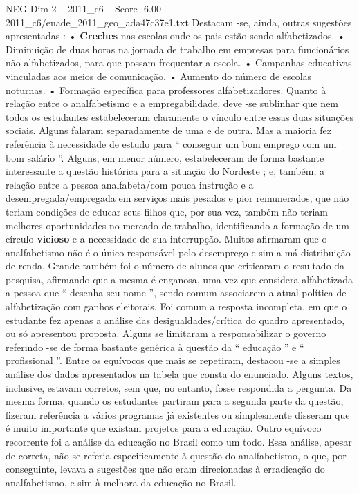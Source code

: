 \begin{textsample}{NEG Dim 2 – 2011\_c6 – Score -6.00 – 2011\_c6/enade\_2011\_geo\_ada47c37e1.txt}
Destacam -se, ainda, outras sugestões apresentadas : • \textbf{Creches} nas escolas onde os pais estão sendo alfabetizados. • Diminuição de duas horas na jornada de trabalho em empresas para funcionários não alfabetizados, para que possam frequentar a escola. • Campanhas educativas vinculadas aos meios de comunicação. • Aumento do número de escolas noturnas. • Formação específica para professores alfabetizadores.
Quanto à relação entre o analfabetismo e a empregabilidade, deve -se sublinhar que nem todos os estudantes estabeleceram claramente o vínculo entre essas duas situações sociais.
Alguns falaram separadamente de uma e de outra.
Mas a maioria fez referência à necessidade de estudo para “ conseguir um bom emprego com um bom salário ”.
Alguns, em menor número, estabeleceram de forma bastante interessante a questão histórica para a situação do Nordeste ; e, também, a relação entre a pessoa analfabeta/com pouca instrução e a desempregada/empregada em serviços mais pesados e pior remunerados, que não teriam condições de educar seus filhos que, por sua vez, também não teriam melhores oportunidades no mercado de trabalho, identificando a formação de um círculo \textbf{vicioso} e a necessidade de sua interrupção.
Muitos afirmaram que o analfabetismo não é o único responsável pelo desemprego e sim a má distribuição de renda.
Grande também foi o número de alunos que criticaram o resultado da pesquisa, afirmando que a mesma é enganosa, uma vez que considera alfabetizada a pessoa que “ desenha seu nome ”, sendo comum associarem a atual política de alfabetização com ganhos eleitorais.
Foi comum a resposta incompleta, em que o estudante fez apenas a análise das desigualdades/crítica do quadro apresentado, ou só apresentou proposta.
Alguns se limitaram a responsabilizar o governo referindo -se de forma bastante genérica à questão da “ educação ” e “ profissional ”.
Entre os equívocos que mais se repetiram, destacou -se a simples análise dos dados apresentados na tabela que consta do enunciado.
Alguns textos, inclusive, estavam corretos, sem que, no entanto, fosse respondida a pergunta.
Da mesma forma, quando os estudantes partiram para a segunda parte da questão, fizeram referência a vários programas já existentes ou simplesmente disseram que é muito importante que existam projetos para a educação.
Outro equívoco recorrente foi a análise da educação no Brasil como um todo.
Essa análise, apesar de correta, não se referia especificamente à questão do analfabetismo, o que, por conseguinte, levava a sugestões que não eram direcionadas à erradicação do analfabetismo, e sim à melhora da educação no Brasil.

\end{textsample}
